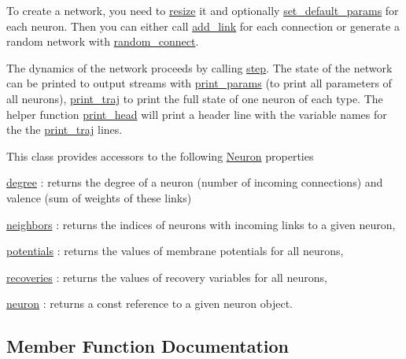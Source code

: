 To create a network, you need to \hyperlink{classNetwork_ad91ae24f308dd2b46ff76396fcdb9765}{resize} it and optionally \hyperlink{classNetwork_ad1d20020028425cfab199da1942172c9}{set\+\_\+default\+\_\+params} for each neuron. Then you can either call \hyperlink{classNetwork_a6ebe0899329973e4924997a25e205856}{add\+\_\+link} for each connection or generate a random network with \hyperlink{classNetwork_a681d8f731ce258376a20f9bf062b943b}{random\+\_\+connect}.

The dynamics of the network proceeds by calling \hyperlink{classNetwork_a4614f267a2238b8a10dfea23b54defac}{step}. The state of the network can be printed to output streams with \hyperlink{classNetwork_afc43116eb2429aeec0f3c6a54d252142}{print\+\_\+params} (to print all parameters of all neurons), \hyperlink{classNetwork_ae460d31557bba058fdf66e4fe5feb801}{print\+\_\+traj} to print the full state of one neuron of each type. The helper function \hyperlink{classNetwork_ab572dd33cb91d9f0aae89c4477809d26}{print\+\_\+head} will print a header line with the variable names for the the \hyperlink{classNetwork_ae460d31557bba058fdf66e4fe5feb801}{print\+\_\+traj} lines.

This class provides accessors to the following \hyperlink{classNeuron}{Neuron} properties
\begin{DoxyItemize}
\item \hyperlink{classNetwork_a06de035ba134c5aed590bd5f9f8035d1}{degree} \+: returns the degree of a neuron (number of incoming connections) and valence (sum of weights of these links)
\item \hyperlink{classNetwork_abf7324fe99e691cb9b06247e5e5013fd}{neighbors} \+: returns the indices of neurons with incoming links to a given neuron,
\item \hyperlink{classNetwork_a44d9c341bfec26cb37efe3c29fd7a103}{potentials} \+: returns the values of membrane potentials for all neurons,
\item \hyperlink{classNetwork_a2e9dbb815c622cccdd50186ae8c9f4a7}{recoveries} \+: returns the values of recovery variables for all neurons,
\item \hyperlink{classNetwork_a4639c4fd24bc6dc807ae35af6577ed7f}{neuron} \+: returns a const reference to a given neuron object. 
\end{DoxyItemize}

\subsection{Member Function Documentation}
\mbox{\label{classNetwork_a6ebe0899329973e4924997a25e205856}} 

